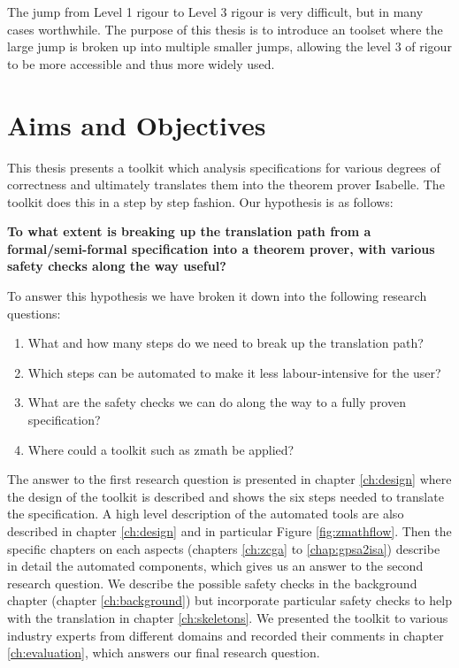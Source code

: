 The jump from Level 1 rigour to Level 3 rigour is very difficult, but in many
cases worthwhile. The purpose of this thesis is to introduce an toolset where
the large jump is broken up into multiple smaller jumps, allowing the level 3 of
rigour to be more accessible and thus more widely used. 

\section{Aims and Objectives}
This thesis presents a toolkit which analysis specifications for various degrees
of correctness and ultimately translates them into the theorem prover Isabelle.
The toolkit does this in a step by
step fashion. 
Our hypothesis is as follows:

\textbf{To what extent is breaking up the translation path from a
formal/semi-formal specification into a theorem prover, with various
safety checks along the way useful?}

To answer this hypothesis we have broken it down into the following research
questions:

\begin{enumerate}
    \item What and how many steps do we need to break up the translation path?
    \item Which steps can be automated to make it less labour-intensive for the user?
    \item What are the safety checks we can do along the way to a fully proven specification?
    \item Where could a toolkit such as \gls{zmath} be applied?
\end{enumerate}

The answer to the first research question is presented in chapter
\ref{ch:design} where the design of the toolkit is described and shows the six
steps needed to translate the specification. A high level description of the
automated tools are also described in chapter \ref{ch:design} and in particular
Figure \ref{fig:zmathflow}. Then the specific chapters on each aspects (chapters
\ref{ch:zcga} to \ref{chap:gpsa2isa}) describe in detail the automated
components, which gives us an answer to the second research question. We
describe the possible safety checks in the background chapter (chapter
\ref{ch:background}) but incorporate particular safety checks to help with the
translation in chapter \ref{ch:skeletons}. We presented the toolkit
to various industry experts from different domains and recorded their comments
in chapter \ref{ch:evaluation}, which answers our final research question.

